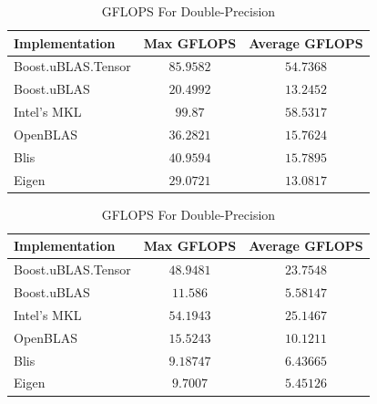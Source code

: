 \begin{table}[ht]
    \centering
    \caption{GFLOPS For Single-Precision}
    \begin{tabular}{|l|c|c|}
        \hline
        \textbf{Implementation} & \textbf{Max GFLOPS} & \textbf{Average GFLOPS}\\
        \hline
        Boost.uBLAS.Tensor  & $85.9582$ & $54.7368$ \\
        \hline
        Boost.uBLAS         & $20.4992$ & $13.2452$ \\
        \hline
        Intel's MKL         & $99.87$ & $58.5317$ \\
        \hline
        OpenBLAS            & $36.2821$ & $15.7624$ \\
        \hline
        Blis                & $40.9594$ & $15.7895$ \\
        \hline
        Eigen               & $29.0721$ & $13.0817$ \\
        \hline
    \end{tabular}

    \vspace*{1 cm}

    \centering
    \caption{GFLOPS For Double-Precision}
    \begin{tabular}{|l|c|c|}
        \hline
        \textbf{Implementation} & \textbf{Max GFLOPS} & \textbf{Average GFLOPS}\\
        \hline
        Boost.uBLAS.Tensor  & $48.9481$ & $23.7548$ \\
        \hline
        Boost.uBLAS         & $11.586$ & $5.58147$ \\
        \hline
        Intel's MKL         & $54.1943$ & $25.1467$ \\
        \hline
        OpenBLAS            & $15.5243$ & $10.1211$ \\
        \hline
        Blis                & $9.18747$ & $6.43665$ \\
        \hline
        Eigen               & $9.7007$ & $5.45126$ \\
        \hline
    \end{tabular}
\end{table}

